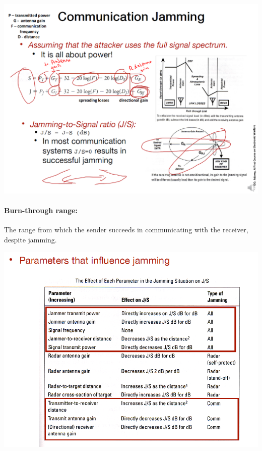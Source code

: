 \begin{minipage}{\linewidth}
    \centering      
    \includegraphics[width=\linewidth]{Figures/L2_communication_jamming.PNG} 
\end{minipage}

\paragraph{Burn-through range:} The range from which the sender
succeeds in communicating with the receiver, despite jamming.

\begin{minipage}{\linewidth}
    \centering      
    \includegraphics[width=\linewidth]{Figures/L2_jamming_params.PNG} 
\end{minipage}

